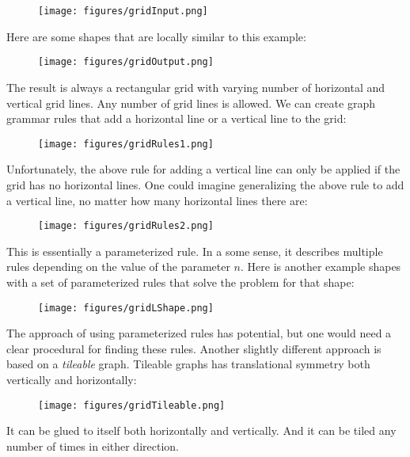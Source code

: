 \documentclass[acmtog]{acmart}
\begin{document}
\begin{figure}[H]
\centering
\texttt{[image: figures/gridInput.png]}
\end{figure}

Here are some shapes that are locally similar to this example:

\begin{figure}[H]
\centering
\texttt{[image: figures/gridOutput.png]}
\end{figure}

The result is always a rectangular grid with varying number of horizontal and
vertical grid lines. Any number of grid lines is allowed. We can create graph
grammar rules that add a horizontal line or a vertical line to the grid:

\begin{figure}[H]
\centering
\texttt{[image: figures/gridRules1.png]}
\end{figure}

Unfortunately, the above rule for adding a vertical line can only be applied if
the grid has no horizontal lines. One could imagine generalizing the above rule
to add a vertical line, no matter how many horizontal lines there are:

\begin{figure}[H]
\centering
\texttt{[image: figures/gridRules2.png]}
\end{figure}

This is essentially a parameterized rule. In a some sense, it describes 
multiple rules depending on the value of the parameter $n$. Here is another 
example shapes with a set of parameterized rules that solve the problem for 
that shape:

\begin{figure}[H]
\centering
\texttt{[image: figures/gridLShape.png]}
\end{figure}

The approach of using parameterized rules has potential, but one would need a 
clear procedural for finding these rules. Another slightly different 
approach is based on a \textit{tileable} graph. Tileable graphs has 
translational symmetry both vertically and horizontally:

\begin{figure}[H]
\centering
\texttt{[image: figures/gridTileable.png]}
\end{figure}

It can be glued to itself both horizontally and vertically. And it can be tiled
any number of times in either direction.
\end{document}
